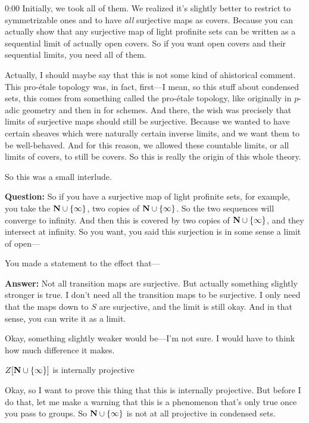 \begin{unfinished}{0:00}
Initially, we took all of them. We realized it's slightly better to restrict to symmetrizable ones and to have \emph{all} surjective maps as covers. Because you can actually show that any surjective map of light profinite sets can be written as a sequential limit of actually open covers. So if you want open covers and their sequential limits, you need all of them.

Actually, I should maybe say that this is not some kind of ahistorical comment. This pro-étale topology was, in fact, first---I mean, so this stuff about condensed sets, this comes from something called the pro-étale topology, like originally in $p$-adic geometry and then in for schemes. 
And there, the wish was precisely that limits of surjective maps should still be surjective. Because we wanted to have certain sheaves which were naturally certain inverse limits, and we want them to be well-behaved. And for this reason, we allowed these countable limits, or all limits of covers, to still be covers. So this is really the origin of this whole theory.

So this was a small interlude. 

\textbf{Question:} So if you have a surjective map of light profinite sets, for example, you take the $\mathbf N \cup \{\infty\}$, two copies of $\mathbf N \cup \{\infty\}$. So the two sequences will converge to infinity. And then this is covered by two copies of $\mathbf N \cup \{\infty\}$, and they intersect at infinity. So you want, you said this surjection is in some sense a limit of open---

You made a statement to the effect that--- 

\textbf{Answer:} Not all transition maps are surjective. But actually something slightly stronger is true. I don't need all the transition maps to be surjective. I only need that the maps down to $S$ are surjective, and the limit is still okay. And in that sense, you can write it as a limit.

Okay, something slightly weaker would be---I'm not sure. I would have to think how much difference it makes.

\begin{sketch}
$Z[\mathbf N \cup \{\infty\}]$ is internally projective
\end{sketch}
Okay, so I want to prove this thing that this is internally projective. But before I do that, let me make a warning that this is a phenomenon that's only true once you pass to groups. So $\mathbf N \cup \{\infty\}$ is not at all projective in condensed sets.


\end{unfinished}
